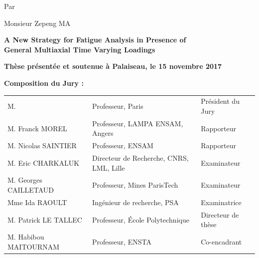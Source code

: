 \begin{titlepage}
\begin{mdframed}
\begin{minipage}[t][22cm][t]{\textwidth}
\begin{center}
{\large Par}
\vspace{12pt}

{\LARGE Monsieur Zepeng MA}
\vspace{36pt}

{\LARGE\bfseries
A New Strategy for Fatigue Analysis in Presence of 
 \\ \vspace{0.4cm}
General Multiaxial Time Varying Loadings}
\end{center}

\vfill
\begin{flushleft}
\large
\textbf{Thèse présentée et soutenue à Palaiseau, le 15 novembre 2017}
\vspace{15pt}

\textbf{Composition du Jury :}

\vspace{15pt}
\begin{tabular}{@{}lll}
M.  & Professeur, Paris & Président du Jury \\
M. Franck MOREL & Professeur, LAMPA ENSAM, Angers & Rapporteur \\
M. Nicolas SAINTIER & Professeur, ENSAM & Rapporteur \\
M. Eric CHARKALUK & Directeur de Recherche, CNRS, LML, Lille & Examinateur \\
M. Georges CAILLETAUD & Professeur, Mines ParisTech & Examinateur \\
Mme Ida RAOULT & Ingénieur de recherche, PSA & Examinatrice \\
M. Patrick LE TALLEC & Professeur, École Polytechnique & Directeur de thèse \\
M. Habibou MAITOURNAM & Professeur, ENSTA & Co-encadrant 

\end{tabular}
\end{flushleft}
\end{minipage}
\end{mdframed}
\end{titlepage}

\setcounter{page}{2}
\restoregeometry
